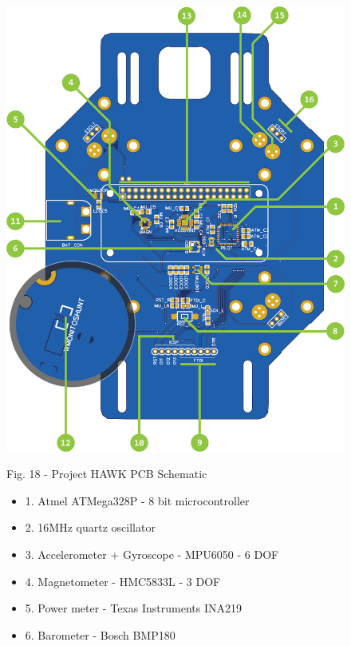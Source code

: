 \documentclass{IEEEtran}
\begin{document}
\begin{figure}
\begin{center}\includegraphics[scale=.95]{pcbschematic.png}\end{center}
\begin{it}\begin{center}Fig. 18 - Project HAWK PCB Schematic \end{center}\end{it}
\begin{multicols}{2}
\begin{itemize}
    \item[] 1. Atmel ATMega328P - 8 bit microcontroller
    \item[] 2. 16MHz quartz oscillator
    \item[] 3.  Accelerometer + Gyroscope - MPU6050 - 6 DOF
    \item[] 4. Magnetometer - HMC5833L - 3 DOF
    \item[] 5. Power meter - Texas Instruments INA219
    \item[] 6. Barometer - Bosch BMP180 

\end{itemize}
\end{multicols}
\end{figure}
\end{document}
